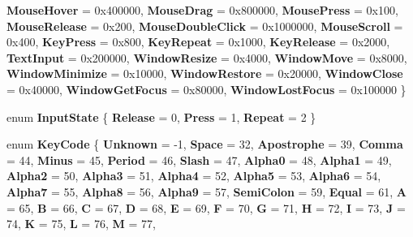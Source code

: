 \begin{DoxyCompactItemize}
{\bfseries Mouse\+Hover} = 0x400000, 
{\bfseries Mouse\+Drag} = 0x800000, 
{\bfseries Mouse\+Press} = 0x100, 
{\bfseries Mouse\+Release} = 0x200, 
\newline
{\bfseries Mouse\+Double\+Click} = 0x1000000, 
{\bfseries Mouse\+Scroll} = 0x400, 
{\bfseries Key\+Press} = 0x800, 
{\bfseries Key\+Repeat} = 0x1000, 
\newline
{\bfseries Key\+Release} = 0x2000, 
{\bfseries Text\+Input} = 0x200000, 
{\bfseries Window\+Resize} = 0x4000, 
{\bfseries Window\+Move} = 0x8000, 
\newline
{\bfseries Window\+Minimize} = 0x10000, 
{\bfseries Window\+Restore} = 0x20000, 
{\bfseries Window\+Close} = 0x40000, 
{\bfseries Window\+Get\+Focus} = 0x80000, 
\newline
{\bfseries Window\+Lost\+Focus} = 0x100000
 \}
\item 
\mbox{\label{namespace_space_v_i_l_1_1_core_aaddd333f7539829655cfa6886e4c586b}} 
enum {\bfseries Input\+State} \{ {\bfseries Release} = 0, 
{\bfseries Press} = 1, 
{\bfseries Repeat} = 2
 \}
\item 
\mbox{\label{namespace_space_v_i_l_1_1_core_a8c5337229bf7d8d51d9bb6a4db901f15}} 
enum {\bfseries Key\+Code} \{ \newline
{\bfseries Unknown} = -\/1, 
{\bfseries Space} = 32, 
{\bfseries Apostrophe} = 39, 
{\bfseries Comma} = 44, 
\newline
{\bfseries Minus} = 45, 
{\bfseries Period} = 46, 
{\bfseries Slash} = 47, 
{\bfseries Alpha0} = 48, 
\newline
{\bfseries Alpha1} = 49, 
{\bfseries Alpha2} = 50, 
{\bfseries Alpha3} = 51, 
{\bfseries Alpha4} = 52, 
\newline
{\bfseries Alpha5} = 53, 
{\bfseries Alpha6} = 54, 
{\bfseries Alpha7} = 55, 
{\bfseries Alpha8} = 56, 
\newline
{\bfseries Alpha9} = 57, 
{\bfseries Semi\+Colon} = 59, 
{\bfseries Equal} = 61, 
{\bfseries A} = 65, 
\newline
{\bfseries B} = 66, 
{\bfseries C} = 67, 
{\bfseries D} = 68, 
{\bfseries E} = 69, 
\newline
{\bfseries F} = 70, 
{\bfseries G} = 71, 
{\bfseries H} = 72, 
{\bfseries I} = 73, 
\newline
{\bfseries J} = 74, 
{\bfseries K} = 75, 
{\bfseries L} = 76, 
{\bfseries M} = 77, 
\newline

\end{DoxyCompactItemize}
